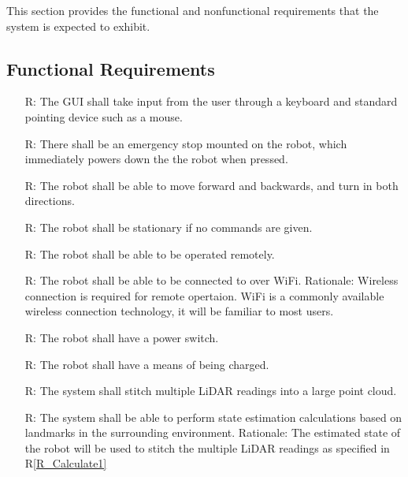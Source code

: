\documentclass[12pt]{article}
\newcounter{reqnum} %
\newcommand{\rref}[1]{R\ref{#1}}
\begin{document}

This section provides the functional and nonfunctional requirements that the
system is expected to exhibit.

\subsection{Functional Requirements}

\noindent \begin{itemize}

\item[R\refstepcounter{reqnum}\thereqnum \label{R_Inputs1}:] The GUI shall take input from the user through a keyboard and standard pointing device such as a mouse.
\item[R\refstepcounter{reqnum}\thereqnum \label{R_Inputs2}:] There shall be an emergency stop mounted on the robot, which immediately powers down the the robot when pressed.
\item[R\refstepcounter{reqnum}\thereqnum \label{R_Inputs3}:] The robot shall be able to move forward and backwards, and turn in both directions.
\item[R\refstepcounter{reqnum}\thereqnum \label{R_Inputs4}:] The robot shall be stationary if no commands are given.
\item[R\refstepcounter{reqnum}\thereqnum \label{R_Inputs5}:] The robot shall be able to be operated remotely.
\item[R\refstepcounter{reqnum}\thereqnum \label{R_Inputs6}:] The robot shall be able to be connected to over WiFi.
\newline Rationale: Wireless connection is required for remote opertaion. WiFi is a commonly available wireless connection technology, it will be familiar to most users. 
\item[R\refstepcounter{reqnum}\thereqnum \label{R_Inputs7}:] The robot shall have a power switch.
\item[R\refstepcounter{reqnum}\thereqnum \label{R_Inputs8}:] The robot shall have a means of being charged.

\item[R\refstepcounter{reqnum}\thereqnum \label{R_Calculate1}:] The system shall stitch multiple LiDAR readings into a large point cloud.
\item[R\refstepcounter{reqnum}\thereqnum \label{R_Calculate2}:] The system shall be able to perform state estimation calculations based on landmarks in the surrounding environment.
\newline Rationale: The estimated state of the robot will be used to stitch the multiple LiDAR readings as specified in \rref{R_Calculate1} 


\end{itemize}
\end{document}
